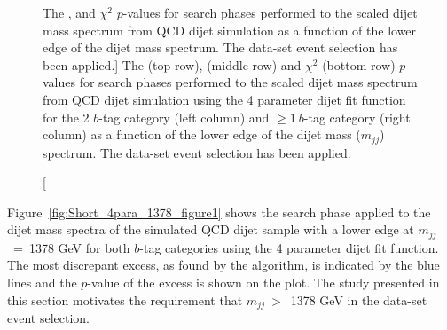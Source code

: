\begin{figure}[!htb]
\begin{center}
  \end{center}
  \vspace{-1em}
  \caption
      [The \bh{},  \dhunt{}  and $\chi^{2}$ \mbox{$p$-value}s
      for search phases performed to the scaled dijet mass spectrum from QCD dijet simulation
      as a function of the lower edge of the dijet mass spectrum.
      The \summer{} data-set event selection has been applied.]
      {The \bh{} (top row),  \dhunt{} (middle row) and $\chi^{2}$ (bottom row) \mbox{$p$-value}s
       for search phases performed to the scaled dijet mass spectrum from QCD dijet simulation
       using the 4 parameter dijet fit function
       for the 2 $b$-tag category (left column) and $\geq1~b$-tag category (right column)
       as a function of the lower edge of the dijet mass ($m_{jj}$) spectrum.
       The \summer{} data-set event selection has been applied.}
  \label{fig:mjjGraphs}
\end{figure}

Figure~\ref{fig:Short_4para_1378_figure1} shows the search phase applied to the dijet mass spectra
of the simulated QCD dijet sample with a lower edge at $m_{jj}$~=~1378 GeV for both $b$-tag categories
 using the 4 parameter dijet fit function.
The most discrepant excess, as found by the \bh{} algorithm, is indicated by the blue lines
and the \mbox{$p$-value} of the excess is shown on the plot.
The study presented in this section motivates the requirement that $m_{jj}~>$~1378 GeV in the \summer{} data-set event selection.

